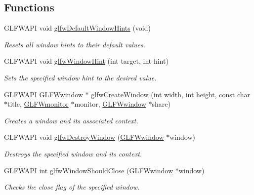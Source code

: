 \subsection*{Functions}
\begin{DoxyCompactItemize}
\item 
G\+L\+F\+W\+A\+P\+I void \hyperlink{group__window_ga8050ddceed9dc6bd9d3aa35666195cd4}{glfw\+Default\+Window\+Hints} (void)
\begin{DoxyCompactList}\small\item\em Resets all window hints to their default values. \end{DoxyCompactList}\item 
G\+L\+F\+W\+A\+P\+I void \hyperlink{group__window_gab6e60483d79175b868d6d4dc1dcc63e2}{glfw\+Window\+Hint} (int target, int hint)
\begin{DoxyCompactList}\small\item\em Sets the specified window hint to the desired value. \end{DoxyCompactList}\item 
G\+L\+F\+W\+A\+P\+I \hyperlink{group__window_ga3c96d80d363e67d13a41b5d1821f3242}{G\+L\+F\+Wwindow} $\ast$ \hyperlink{group__window_ga680a02abe0e4494b6759d5703240713e}{glfw\+Create\+Window} (int width, int height, const char $\ast$title, \hyperlink{group__monitor_ga8d9efd1cde9426692c73fe40437d0ae3}{G\+L\+F\+Wmonitor} $\ast$monitor, \hyperlink{group__window_ga3c96d80d363e67d13a41b5d1821f3242}{G\+L\+F\+Wwindow} $\ast$share)
\begin{DoxyCompactList}\small\item\em Creates a window and its associated context. \end{DoxyCompactList}\item 
G\+L\+F\+W\+A\+P\+I void \hyperlink{group__window_ga806747476b7247d292be3711c323ea10}{glfw\+Destroy\+Window} (\hyperlink{group__window_ga3c96d80d363e67d13a41b5d1821f3242}{G\+L\+F\+Wwindow} $\ast$window)
\begin{DoxyCompactList}\small\item\em Destroys the specified window and its context. \end{DoxyCompactList}\item 
G\+L\+F\+W\+A\+P\+I int \hyperlink{group__window_gaa6162f67dfa38b8beda2fea623649332}{glfw\+Window\+Should\+Close} (\hyperlink{group__window_ga3c96d80d363e67d13a41b5d1821f3242}{G\+L\+F\+Wwindow} $\ast$window)
\begin{DoxyCompactList}\small\item\em Checks the close flag of the specified window. \end{DoxyCompactList}\item 

\end{DoxyCompactItemize}
